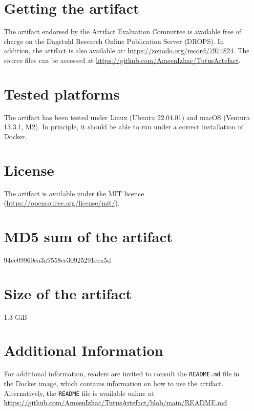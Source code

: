 \documentclass[a4paper,UKenglish]{darts-v2021}
\newenvironment{getting}{\section{Getting the artifact} The artifact
endorsed by the Artifact Evaluation Committee is available free of
charge on the Dagstuhl Research Online Publication Server (DROPS).}{}
\newenvironment{platforms}{\section{Tested platforms}}{}
\newcommand{\license}[1]{{\section{License}#1}}
\newcommand{\mdsum}[1]{{\section{MD5 sum of the artifact}#1}}
\newcommand{\artifactsize}[1]{{\section{Size of the artifact}#1}}
\begin{document}
\begin{getting}
In addition, the artifact is also available at:
\url{https://zenodo.org/record/7974824}.
The source files can be accessed at
\url{https://github.com/AmeenIzhac/TutusArtefact}.
\end{getting}

\begin{platforms}
  The artifact has been tested under Linux (Ubuntu 22.04.01) and macOS (Ventura
  13.3.1, M2).
  In principle, it should be able to run under a correct installation of Docker.
\end{platforms}

\license{The artifact is available under the MIT licence (\url{https://opensource.org/license/mit/}).}

\mdsum{94cc09960ca3a9558cc30925291eca5d}

\artifactsize{1.3 GiB}

\appendix
\section{Additional Information}
For additional information, readers are invited to consult the
\texttt{README.md} file in the Docker image, which contains information on how
to use the artifact.
Alternatively, the \texttt{README} file is available online at
\url{https://github.com/AmeenIzhac/TutusArtefact/blob/main/README.md}.
\end{document}
